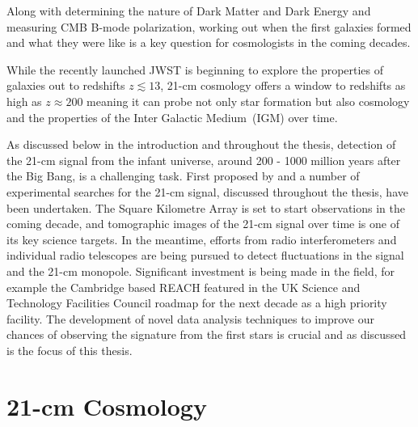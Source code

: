 Along with determining the nature of Dark Matter and Dark Energy and measuring CMB B-mode polarization, working out when the first galaxies formed and what they were like is a key question for cosmologists in the coming decades.

While the recently launched JWST \cite{Windhorst_JWST_2006, Rieke2023} is beginning to explore the properties of galaxies out to redshifts $z \lesssim 13$, 21-cm cosmology offers a window to redshifts as high as $z\approx200$ \cite{Furlanetto_review_2006} meaning it can probe not only star formation but also cosmology and the properties of the Inter Galactic Medium~(IGM) over time.

As discussed below in the introduction and throughout the thesis, detection of the 21-cm signal from the infant universe, around 200 - 1000 million years after the Big Bang, is a challenging task. First proposed by \cite{Madau1997} and \cite{Shaver1999} a number of experimental searches for the 21-cm signal, discussed throughout the thesis, have been undertaken. The Square Kilometre Array is set to start observations in the coming decade, and tomographic images of the 21-cm signal over time is one of its key science targets. In the meantime, efforts from radio interferometers and individual radio telescopes are being pursued to detect fluctuations in the signal and the 21-cm monopole. Significant investment is being made in the field, for example the Cambridge based REACH featured in the UK Science and Technology Facilities Council roadmap for the next decade \cite{Serjeant2023a} as a high priority facility. The development of novel data analysis techniques to improve our chances of observing the signature from the first stars is crucial and as discussed is the focus of this thesis.


\section{21-cm Cosmology}


